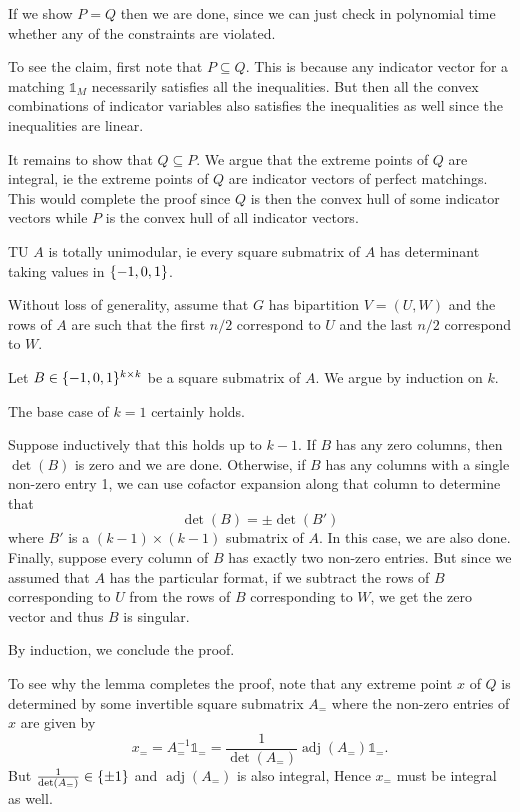 \documentclass[10pt]{article}
\DeclarePairedDelimiter{\set}{\lbrace}{\rbrace}
\DeclareMathOperator{\adj}{adj}
\newcommand{\ones}{\mathds{1}}
\newcommand{\sset}{\subseteq}
\begin{document}
If we show $P=Q$ then we are done,
since we can just check in polynomial time whether any of the constraints are violated.

To see the claim,
first note that $P\sset Q$.
This is because any indicator vector for a matching $\ones_M$
necessarily satisfies all the inequalities.
But then all the convex combinations of indicator variables
also satisfies the inequalities as well since the inequalities are linear.

It remains to show that $Q\sset P$.
We argue that the extreme points of $Q$ are integral,
ie the extreme points of $Q$ are indicator vectors of perfect matchings.
This would complete the proof
since $Q$ is then the convex hull of some indicator vectors
while $P$ is the convex hull of all indicator vectors.

\begin{lem}{}{TU}
  $A$ is totally unimodular,
  ie every square submatrix of $A$ has determinant taking values in $\set{-1, 0, 1}$.
\end{lem}

\begin{pf}{}{}
  Without loss of generality,
  assume that $G$ has bipartition $V = (U, W)$
  and the rows of $A$ are such that the first $n/2$ correspond to $U$
  and the last $n/2$ correspond to $W$.

  Let $B\in \set{-1, 0, 1}^{k\times k}$ be a square submatrix of $A$.
  We argue by induction on $k$.

  The base case of $k=1$ certainly holds.

  Suppose inductively that this holds up to $k-1$.
  If $B$ has any zero columns,
  then $\det(B)$ is zero and we are done.
  Otherwise,
  if $B$ has any columns with a single non-zero entry 1,
  we can use cofactor expansion along that column to determine that
  \[
    \det(B) = \pm \det(B')
  \]
  where $B'$ is a $(k-1)\times (k-1)$ submatrix of $A$.
  In this case,
  we are also done.
  Finally,
  suppose every column of $B$ has exactly two non-zero entries.
  But since we assumed that $A$ has the particular format,
  if we subtract the rows of $B$ corresponding to $U$
  from the rows of $B$ corresponding to $W$,
  we get the zero vector and thus $B$ is singular.

  By induction,
  we conclude the proof.
\end{pf}

To see why the lemma completes the proof,
note that any extreme point $x$ of $Q$ is determined by some invertible square submatrix $A_=$
where the non-zero entries of $x$ are given by
\[
  x_=
  = A_=^{-1} \ones_=
  = \frac1{\det(A_=)} \adj(A_=) \ones_=.
\]
But $\frac1{\det(A_=)}\in \set{\pm 1}$ and $\adj(A_=)$ is also integral,
Hence $x_=$ must be integral as well.
\end{document}
